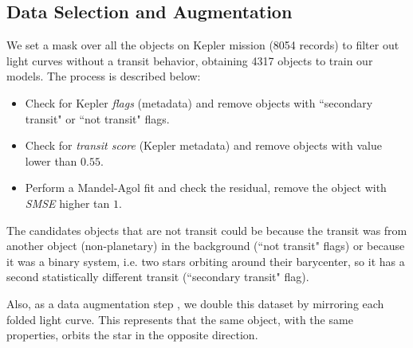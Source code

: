 \subsection{Data Selection and Augmentation} %

We set a mask over all the objects on Kepler mission (8054 records) to filter out light curves without a transit behavior, obtaining 4317 objects to train our models. The process is described below:
\begin{itemize}
    \item Check for Kepler \textit{flags} (metadata) and remove objects with ``secondary transit" or ``not transit" flags.
    \item Check for \textit{transit score} (Kepler metadata) and remove objects with value lower than $0.55$.
    \item Perform a Mandel-Agol fit and check the residual, remove the object with \textit{SMSE} higher tan $1$.
\end{itemize}
The candidates objects that are not transit could be because the transit was from another object (non-planetary) in the background (``not transit" flags) or because it was a binary system, i.e. two stars orbiting around their barycenter, so it has a second statistically different transit (``secondary transit" flag).

Also, as a data augmentation step \citep{tiensuu2019detecting}, we double this dataset by mirroring each folded light curve. This represents that the same object, with the same properties, orbits the star in the opposite direction. 


